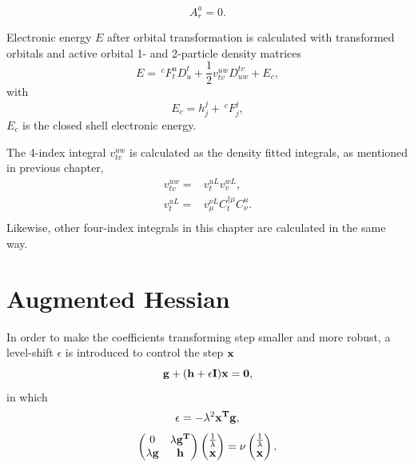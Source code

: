 \documentclass[a4paper,12pt,oneside]{book}
\newcommand{\pre}[1]{\,#1\!}
\begin{document}
\begin{equation}
  A_r^a=0.
\end{equation}

Electronic energy $E$ after orbital transformation is calculated with transformed orbitals and active orbital 1- and 2-particle density matrices
\begin{equation}
E=\pre{^c}F_t^uD^t_u+\frac{1}{2}v^{uw}_{tv}D^{tv}_{uw}+E_c,
\end{equation}
with
\begin{equation}
  E_c=h^j_j+\pre{^c}F_j^j,
\end{equation}
$E_c$ is the closed shell electronic energy.

The 4-index integral $v^{uw}_{tv}$ is calculated as the density fitted integrals, as mentioned in previous chapter,
\begin{equation}
\begin{aligned}
  v^{uw}_{tv} =& v^{uL}_t v^{wL}_v,\\
  v^{uL}_t =& v^{\nu L}_{\mu} C_t^{\dagger \mu} C^u_{\nu}.\\
\end{aligned}
\end{equation}
Likewise, other four-index integrals in this chapter are calculated in the same way.


\section{Augmented Hessian}
In order to make the coefficients transforming step smaller and more robust, 
a level-shift $\epsilon$ is introduced to control the step $\bf{x}$ \cite{augmentedHessian1981}
\begin{equation}
\bf{g}+(\bf{h}+\epsilon \bf{I})\bf{x}=0,
\end{equation}
in which
\begin{equation}
\epsilon =-\lambda^2\bf{x}^T\bf{g},
\end{equation}
\begin{equation}
\begin{pmatrix}
    0 & \lambda \bf{g}^T \\
    \lambda \bf{g} & \bf{h}
\end{pmatrix}
\begin{pmatrix}
    \frac{1}{\lambda} \\
    \bf{x}
\end{pmatrix}
= \nu
\begin{pmatrix}
    \frac{1}{\lambda} \\
    \bf{x}
\end{pmatrix}.
\end{equation}
\end{document}
